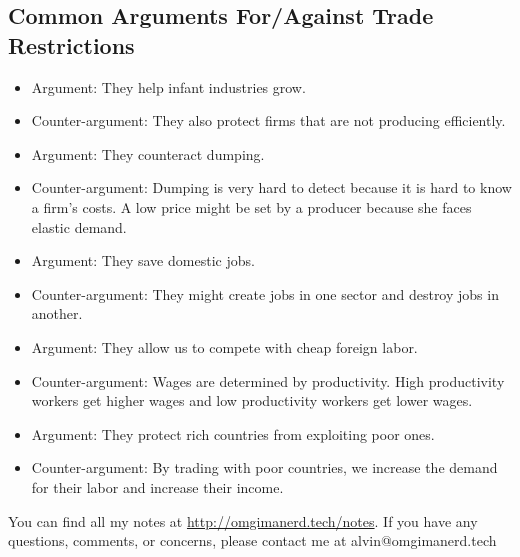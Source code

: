 \documentclass[letterpaper, 12pt]{article}
\begin{document}
\subsection{Common Arguments For/Against Trade Restrictions}
\begin{itemize}
  \item Argument: They help infant industries grow.
  \item Counter-argument: They also protect firms that are not producing
  efficiently.
  \item Argument: They counteract dumping.
  \item Counter-argument: Dumping is very hard to detect because it
  is hard to know a firm's costs. A low price might be set by a producer
  because she faces elastic demand.
  \item Argument: They save domestic jobs.
  \item Counter-argument: They might create jobs in one sector and destroy
  jobs in another.
  \item Argument: They allow us to compete with cheap foreign labor.
  \item Counter-argument: Wages are determined by productivity. High
  productivity workers get higher wages and low productivity workers get lower
  wages.
  \item Argument: They protect rich countries from exploiting poor ones.
  \item Counter-argument: By trading with poor countries, we increase the
  demand for their labor and increase their income.
\end{itemize}

\begin{center}
  You can find all my notes at \url{http://omgimanerd.tech/notes}. If you have
  any questions, comments, or concerns, please contact me at
  alvin@omgimanerd.tech
\end{center}
\end{document}
